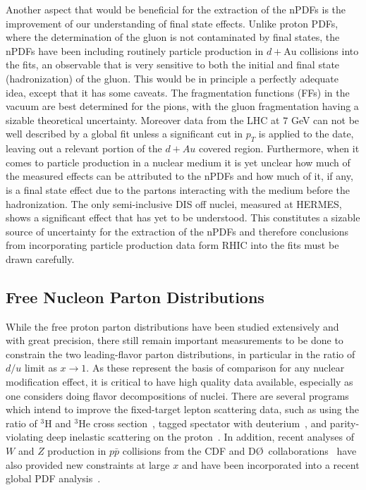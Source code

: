 Another aspect that would be beneficial for the extraction of the nPDFs is the improvement of our understanding of final state effects. Unlike proton PDFs, where the determination of the gluon is not contaminated by final states, the nPDFs have been including routinely particle production in $d+\mathrm{Au}$ collisions into the fits, an observable that is very sensitive to both the initial and final state (hadronization) of the gluon. This would be in principle a perfectly adequate idea, except that it has some caveats. The fragmentation functions (FFs) in the vacuum are best determined for the pions, with the gluon fragmentation having a sizable theoretical uncertainty. Moreover data from the LHC at $7$ GeV can not be well described by a global fit unless a significant cut in $p_{T}$ is applied to the date, leaving out a relevant portion of the $d+Au$ covered region. Furthermore, when it comes to particle production in a nuclear medium it is yet unclear how much of the measured effects can be attributed to the nPDFs and how much of it, if any, is a final state effect due to the partons interacting with the medium before the hadronization. The only semi-inclusive DIS off nuclei, measured at HERMES, shows a significant effect that has yet to be understood. This constitutes a sizable source of uncertainty for the extraction of the nPDFs and therefore conclusions from incorporating particle production data form RHIC into the fits must be drawn carefully.


\subsection{Free Nucleon Parton Distributions}

While the free proton parton distributions have been studied extensively and with great precision, there still remain important measurements to be done to constrain the two leading-flavor parton distributions, in particular in the ratio of $d/u$ limit as $x \rightarrow 1$.  As these represent the basis of comparison for any nuclear modification effect, it is critical to have high quality data available, especially as one considers doing flavor decompositions of nuclei.  There are several programs which intend to improve the fixed-target lepton scattering data, such as using the ratio of ${}^{3}$H and ${}^{3}$He cross section~\cite{mar}, tagged spectator with deuterium~\cite{bonus12}, and parity-violating deep inelastic scattering on the proton~\cite{solid_pvdis}.  In addition, recent analyses of $W$ and $Z$ production in $p\bar{p}$ collisions from the CDF and D\O\ collaborations~\cite{D0:2014kma,Abazov:2013dsa,Acosta:2005ud,Aaltonen:2009ta,Aaltonen:2010zza,Abazov:2007jy} have also provided new constraints at large $x$ and have been incorporated into a recent global PDF analysis~\cite{Accardi:2016qay}.

